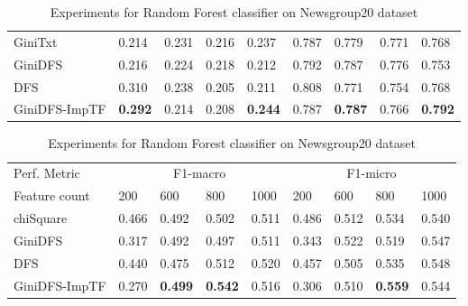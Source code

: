 \documentclass[a4paper, 14pt]{article}
\begin{document}
\begin{justify}
\begin{table}[h!]
\begin{tabular}{l|llll|llll}
    GiniTxt &0.214  & 0.231 & 0.216 & 0.237 &0.787 & 0.779 & 0.771 & 0.768 \\
    GiniDFS &0.216  & 0.224 & 0.218 & 0.212 & 0.792  & 0.787 & 0.776 & 0.753 \\
    DFS & 0.310  & 0.238 & 0.205 & 0.211 & 0.808  & 0.771 & 0.754 & 0.768  \\
    GiniDFS-ImpTF & \textbf{0.292}  & 0.214 & 0.208 & \textbf{0.244} & 0.787  & \textbf{0.787} & 0.766 & \textbf{0.792} \\
   
    
    \bottomrule
\end{tabular}
\caption{Experiments for Random Forest classifier on Reuters-8 dataset}\label{table:somename}

\vspace{15}

\begin{tabular}{l|llll|llll}
\toprule 
    Perf. Metric & \multicolumn{4}{c}{F1-macro} & \multicolumn{4}{c}{F1-micro}  \\


    Feature count & 200  & 600 & 800 & 1000 & 
     200  & 600 & 800 & 1000  \\
    
    \midrule
    chiSquare &0.466  & 0.492 & 0.502 & 0.511 & 0.486  & 0.512 & 0.534 & 0.540 \\
    GiniDFS &0.317  & 0.492 & 0.497 & 0.511 & 0.343  & 0.522 & 0.519 & 0.547 \\
    DFS & 0.440  & 0.475 & 0.512 & 0.520 & 0.457 &  0.505 & 0.535 & 0.548  \\
    GiniDFS-ImpTF &0.270  & \textbf{0.499} & \textbf{0.542} & 0.516 & 0.306  & 0.510 & \textbf{0.559} & 0.544  \\
   
    
    \bottomrule
\end{tabular}
\caption{Experiments for Random Forest classifier on Newsgroup20 dataset}\label{table:somename}




\end{table}
\newpage
\vspace{15}




\vspace{15}


\end{justify}

\newpage
\end{document}
